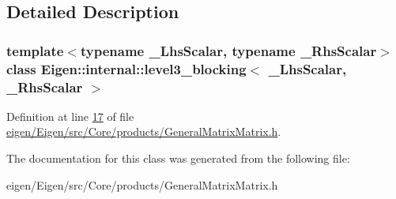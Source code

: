 \subsection{Detailed Description}
\subsubsection*{template$<$typename \+\_\+\+Lhs\+Scalar, typename \+\_\+\+Rhs\+Scalar$>$\newline
class Eigen\+::internal\+::level3\+\_\+blocking$<$ \+\_\+\+Lhs\+Scalar, \+\_\+\+Rhs\+Scalar $>$}



Definition at line \hyperlink{eigen_2_eigen_2src_2_core_2products_2_general_matrix_matrix_8h_source_l00017}{17} of file \hyperlink{eigen_2_eigen_2src_2_core_2products_2_general_matrix_matrix_8h_source}{eigen/\+Eigen/src/\+Core/products/\+General\+Matrix\+Matrix.\+h}.



The documentation for this class was generated from the following file\+:\begin{DoxyCompactItemize}
\item 
eigen/\+Eigen/src/\+Core/products/\+General\+Matrix\+Matrix.\+h\end{DoxyCompactItemize}
